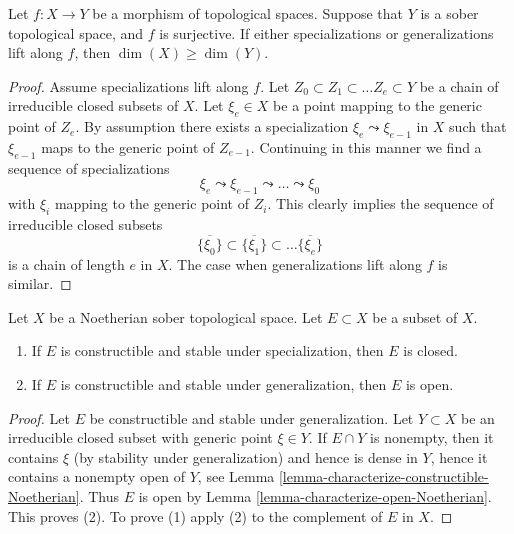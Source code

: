 \begin{lemma}
\label{lemma-dimension-specializations-lift}
Let $f : X \to Y$ be a morphism of topological spaces.
Suppose that $Y$ is a sober topological space, and $f$ is surjective.
If either specializations or generalizations lift along $f$, then
$\dim(X) \geq \dim(Y)$.
\end{lemma}

\begin{proof}
Assume specializations lift along $f$.
Let $Z_0 \subset Z_1 \subset \ldots Z_e \subset Y$ be a chain
of irreducible closed subsets of $X$. Let $\xi_e \in X$ be a point
mapping to the generic point of $Z_e$. By assumption there
exists a specialization
$\xi_e \leadsto \xi_{e - 1}$ in $X$ such that $\xi_{e - 1}$ maps to
the generic point of $Z_{e - 1}$. Continuing in this manner we find
a sequence of specializations
$$
\xi_e \leadsto \xi_{e - 1} \leadsto \ldots \leadsto \xi_0
$$
with $\xi_i$ mapping to the generic point of $Z_i$.
This clearly implies the sequence of irreducible closed
subsets
$$
\overline{\{\xi_0\}} \subset
\overline{\{\xi_1\}} \subset \ldots
\overline{\{\xi_e\}}
$$
is a chain of length $e$ in $X$.
The case when generalizations lift along $f$ is similar.
\end{proof}

\begin{lemma}
\label{lemma-characterize-closed-Noetherian}
Let $X$ be a Noetherian sober topological space.
Let $E \subset X$ be a subset of $X$.
\begin{enumerate}
\item If $E$ is constructible and stable under specialization, then
$E$ is closed.
\item If $E$ is constructible and stable under generalization, then
$E$ is open.
\end{enumerate}
\end{lemma}

\begin{proof}
Let $E$ be constructible and stable under generalization.
Let $Y \subset X$ be an irreducible closed subset with generic point
$\xi \in Y$. If $E \cap Y$ is nonempty, then it contains $\xi$ (by
stability under generalization) and hence is dense in $Y$, hence it
contains a nonempty open of $Y$, see
Lemma \ref{lemma-characterize-constructible-Noetherian}.
Thus $E$ is open by
Lemma \ref{lemma-characterize-open-Noetherian}.
This proves (2). To prove (1) apply (2) to the complement of $E$ in $X$.
\end{proof}




